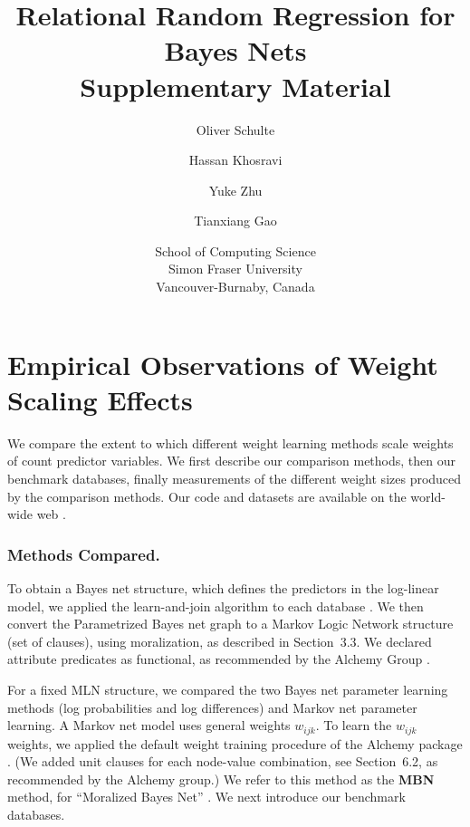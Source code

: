 \documentclass[twoside,leqno,twocolumn]{article}
\title{Relational Random Regression for Bayes Nets\\
Supplementary Material}
\author{Oliver Schulte \and Hassan Khosravi \and Yuke Zhu \and Tianxiang Gao\\
\and 
School of Computing Science\\ Simon Fraser University\\Vancouver-Burnaby, Canada}
\begin{document}
\date{}
\maketitle


\section{Empirical Observations of Weight Scaling Effects}

We compare the extent to which different weight learning methods scale weights of count predictor variables. We first describe our comparison methods, then our benchmark databases, finally measurements of the different weight sizes produced by the comparison methods. Our code and datasets are available on the world-wide web \cite{bib:jbnsite}. 

\subsubsection{Methods Compared.} \label{sec:methods}

To obtain a Bayes net structure, which defines the predictors in the log-linear model, we applied the learn-and-join algorithm to each database %
\cite{Schulte2012}. 
We then convert the Parametrized Bayes net graph to a Markov Logic Network structure (set of clauses), using moralization, as described in Section~3.3.
We declared attribute predicates as functional, as recommended by the Alchemy Group \cite{bib:bayes-convert}. 

For a fixed MLN structure, we compared the two Bayes net parameter learning methods (log probabilities and log differences) and Markov net parameter learning. 
%
%
A Markov net model uses general weights $w_{ijk}$.
To learn the $w_{ijk}$ weights, we applied the default weight training procedure \cite{Lowd2007} of the Alchemy package \cite{Kok2009a}. (We added unit clauses for each node-value combination, see Section~6.2, as recommended by the Alchemy group.)  We refer to this method as the \textbf{MBN} method, for ``Moralized Bayes Net''   \cite{Khosravi2010}. 
%
 We next introduce our benchmark databases.
\end{document}
